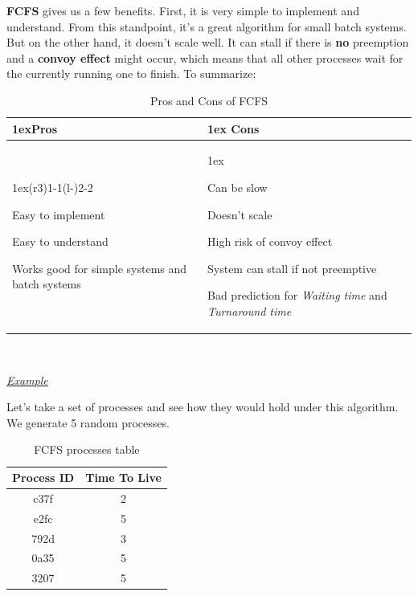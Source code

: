 \documentclass{article}
\begin{document}
\textbf{FCFS} gives us a few benefits. First, it is very simple to implement and understand. From this standpoint, it's a great algorithm for small batch systems. But on the other hand, it doesn't scale well. It can stall if there is \textbf{no} preemption and a \textbf{convoy effect} might occur, which means that all other processes wait for the currently running one to finish. To summarize:

\begin{table}[H]
  \begin{tabularx}{\linewidth}{>{\parskip1ex}X@{\kern4\tabcolsep}>{\parskip1ex}X}
    \toprule
    \hfil\bfseries Pros & \hfil\bfseries Cons \\
    \cmidrule(r{3\tabcolsep}){1-1}\cmidrule(l{-\tabcolsep}){2-2}

    Easy to implement\par
    Easy to understand\par
    Works good for simple systems and batch systems\par

    &

    Can be slow\par
    Doesn't scale\par
    High risk of convoy effect\par
    System can stall if not preemptive\par
    Bad prediction for \textit{Waiting time} and \textit{Turnaround time} \\
    \bottomrule
  \end{tabularx}
  \caption{Pros and Cons of FCFS}
\end{table}

\

\underline{\textit{Example}}

Let's take a set of processes and see how they would hold under this algorithm. We generate 5 random processes.

\begin{table}[H]
  \begin{center}
    \label{tab:FCFS processes}
    \begin{tabular}{c|c}
      \toprule
      \textbf{Process ID} & \textbf{Time To Live} \\
      \midrule
      c37f & 2 \\
      e2fc & 5 \\
      792d & 3 \\
      0a35 & 5 \\
      3207 & 5 \\
      \bottomrule
    \end{tabular}
    \caption{FCFS processes table}
  \end{center}
\end{table}
\end{document}
